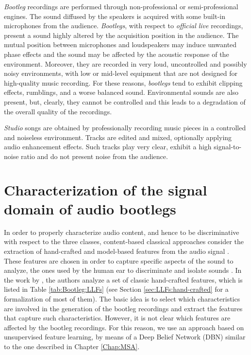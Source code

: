 \textit{Bootleg} recordings are performed through non-professional or semi-professional engines. The sound diffused by the speakers is acquired with some built-in microphones from the audience. \textit{Bootlegs}, with respect to \textit{official live} recordings, present a sound highly altered by the acquisition position in the audience. The mutual position between microphones and loudspeakers may induce unwanted phase effects and the sound may be affected by the acoustic response of the environment. Moreover, they are recorded in very loud, uncontrolled and possibly noisy environments, with low or mid-level equipment that are not designed for high-quality music recording. For these reasons, \textit{bootlegs} tend to exhibit clipping effects, rumblings, and a worse balanced sound. Environmental sounds are also present, but, clearly, they cannot be controlled and this leads to a degradation of the overall quality of the recordings. 

\textit{Studio} songs are obtained by professionally recording music pieces in a controlled and noiseless environment. Tracks are edited and mixed, optionally applying audio enhancement effects. Such tracks play very clear, exhibit a high signal-to-noise ratio and do not present noise from the audience.


\section{Characterization of the signal domain of audio bootlegs}\label{sec:Bootleg:signal}
In order to properly characterize audio content, and hence to be discriminative with respect to the three classes, content-based classical approaches consider the extraction of hand-crafted and model-based features from the audio signal \cite{Kim2005}.
These features are chosen in order to capture specific aspects of the sound to analyze, the ones used  by the human ear to discriminate and isolate sounds \cite{Kim2005,Zanoni2012}.
In the work by \cite{Bestagini2013b}, the authors analyze a set of classic hand-crafted features, which is listed in Table \ref{tab:Bootleg:LLFs} (see Section \ref{sec:LLFs:hand-crafted} for a formalization of most of them). The basic idea is to select which characteristics are involved in the generation of the bootleg recordings and extract the features that capture such characteristics.  However, it is not clear which features are affected by the bootleg recordings. For this reason,  we use an approach based on unsupervised feature learning, by means of a Deep Belief Network (DBN) similar to the one described in Chapter \ref{Chap:MSA}.

